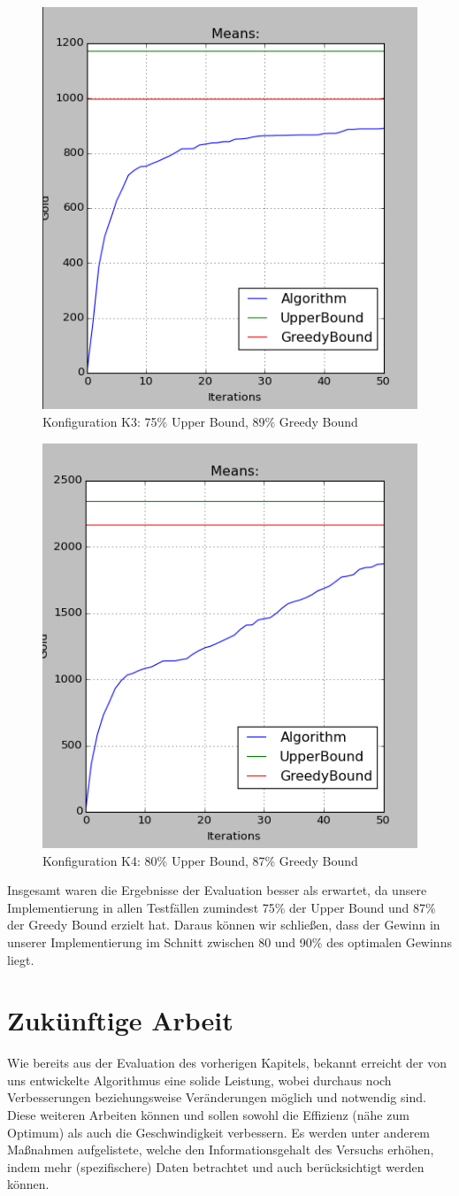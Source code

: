 \documentclass[fleqn,10pt]{SelfArx} %
\begin{document}
\label{fig:eval2}
\begin{figure}
  \centering
  \includegraphics[width=.4\textwidth]{10ad_15ag_50r_50it_cut.png}
  \caption{Konfiguration K3: 75\% Upper Bound, 89\% Greedy Bound}
\end{figure}
\label{fig:eval3}
\begin{figure}
  \centering
  \includegraphics[width=.4\textwidth]{20ad_15ag_50r_50it_cut.png}
  \caption{Konfiguration K4: 80\% Upper Bound, 87\% Greedy Bound}
\end{figure}
\label{fig:eval4}
Insgesamt waren die Ergebnisse der Evaluation besser als erwartet, da unsere Implementierung in allen Testfällen zumindest 75\% der Upper Bound und 87\% der Greedy Bound erzielt hat. Daraus können wir schließen, dass der Gewinn in unserer Implementierung im Schnitt zwischen 80 und 90\% des optimalen Gewinns liegt.
\section{Zukünftige Arbeit}
\label{sec:Future}

Wie bereits aus der Evaluation des vorherigen Kapitels, bekannt erreicht der von uns entwickelte Algorithmus eine solide Leistung, wobei durchaus noch Verbesserungen beziehungsweise Veränderungen möglich und notwendig sind. Diese weiteren Arbeiten können und sollen sowohl die Effizienz (nähe zum Optimum) als auch die Geschwindigkeit verbessern. Es werden unter anderem Maßnahmen aufgelistete, welche den Informationsgehalt des Versuchs erhöhen, indem mehr (spezifischere) Daten betrachtet und auch berücksichtigt werden können.
\end{document}
